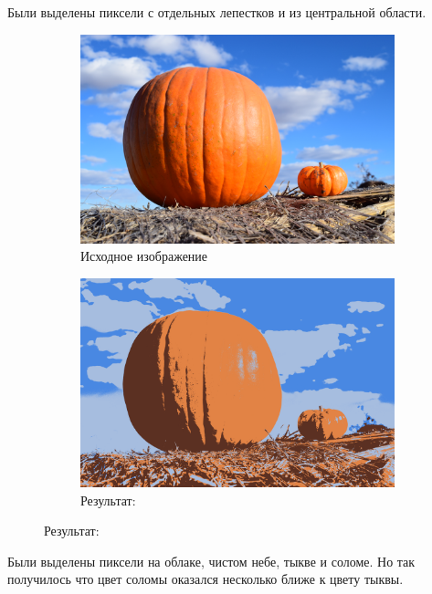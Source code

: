 \documentclass[12pt]{article}
\begin{document}
\begin{figure}[!tbh]
\begin{subfigure}{0.49\textwidth}
	\end{subfigure}
\end{figure}

Были выделены пиксели с отдельных лепестков и из центральной области.

\begin{figure}[!tbh]
	\caption*{Большое изображение: 6000x4000}
	\begin{subfigure}{0.49\textwidth}
		\centering
		\caption*{Исходное изображение}
		\includegraphics[scale=0.79]{pp.png}
	\end{subfigure}
	\begin{subfigure}{0.49\textwidth}
		\centering
		\caption*{Результат:}
		\includegraphics[scale=0.038]{pumpkin-result.png}
	\end{subfigure}
\end{figure}

Были выделены пиксели на облаке, чистом небе, тыкве и соломе.
Но так получилось что цвет соломы оказался несколько ближе к цвету тыквы.
\end{document}
